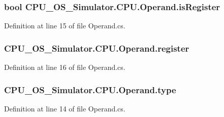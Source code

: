 \subsubsection[{is\+Register}]{\setlength{\rightskip}{0pt plus 5cm}bool C\+P\+U\+\_\+\+O\+S\+\_\+\+Simulator.\+C\+P\+U.\+Operand.\+is\+Register\hspace{0.3cm}{\ttfamily [private]}}\label{class_c_p_u___o_s___simulator_1_1_c_p_u_1_1_operand_a16cc03d0d4c600b864d9c189529a473d}


Definition at line 15 of file Operand.\+cs.

\hypertarget{class_c_p_u___o_s___simulator_1_1_c_p_u_1_1_operand_a55d446765a50844fcbbc56b757b1b679}{}
\subsubsection[{register}]{ C\+P\+U\+\_\+\+O\+S\+\_\+\+Simulator.\+C\+P\+U.\+Operand.\+register\hspace{0.3cm}{\ttfamily [private]}}\label{class_c_p_u___o_s___simulator_1_1_c_p_u_1_1_operand_a55d446765a50844fcbbc56b757b1b679}


Definition at line 16 of file Operand.\+cs.

\hypertarget{class_c_p_u___o_s___simulator_1_1_c_p_u_1_1_operand_abc8f504a22e9a5c49d91b12f61cc5119}{}
\subsubsection[{type}]{ C\+P\+U\+\_\+\+O\+S\+\_\+\+Simulator.\+C\+P\+U.\+Operand.\+type\hspace{0.3cm}{\ttfamily [private]}}\label{class_c_p_u___o_s___simulator_1_1_c_p_u_1_1_operand_abc8f504a22e9a5c49d91b12f61cc5119}


Definition at line 14 of file Operand.\+cs.

